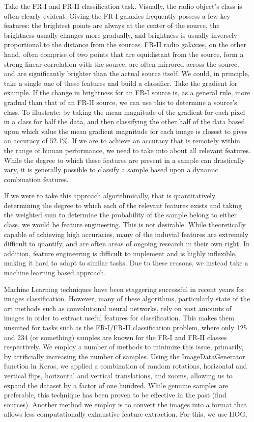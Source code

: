 \documentclass{article}
\begin{document}
Take the FR-I and FR-II classification task. Visually, the radio object's class is often clearly evident. Giving the FR-I galaxies frequently possess a few key features: the brightest points are always at the center of the source, the brightness usually changes more gradually, and brightness is usually inversely proportional to the distance from the sources.  FR-II radio galaxies, on the other hand, often comprise of two points that are equidistant from the source, form a strong linear correlation with the source, are often mirrored across the source, and are significantly brighter than the actual source itself. We could, in principle, take a single one of these features and build a classifier. Take the gradient for example. If the change in brightness for an FR-I source is, as a general rule, more gradual than that of an FR-II source, we can use this to determine a source's class. To illustrate: by taking the mean magnitude of the gradient for each pixel in a class for half the data, and then classifying the other half of the data based upon which value the mean gradient magnitude for each image is closest to gives an accuracy of 52.1\%. If we are to achieve an accuracy that is remotely within the range of human performance, we need to take into about all relevant features. While the degree to which these features are present in a sample can drastically vary, it is generally possible to classify a sample based upon a dynamic combination features. 

If we were to take this approach algorithmically, that is quantitatively determining the degree to which each of the relevant features exists and taking the weighted sum to determine the probability of the sample belong to either class, we would be feature engineering. This is not desirable. While theoretically capable of achieving high accuracies, many of the induvial features are extremely difficult to quantify, and are often areas of ongoing research in their own right. In addition, feature engineering is difficult to implement and is highly inflexible, making it hard to adapt to similar tasks. Due to these reasons, we instead take a machine learning based approach. 

Machine Learning techniques have been staggering successful in recent years for images classification. However, many of these algorithms, particularly state of the art methods such as convolutional neural networks, rely on vast amounts of images in order to extract useful features for classification. This makes them unsuited for tasks such as the FR-I/FR-II classification problem, where only 125 and 234 (or something) samples are known for the FR-I and FR-II classes respectively. We employ a number of methods to minimize this issue, primarily, by artificially increasing the number of samples. Using the ImageDataGenerator function in Keras, we applied a combination of random rotations, horizontal and vertical flips, horizontal and vertical translations, and zooms, allowing us to expand the dataset by a factor of one hundred. While genuine samples are preferable, this technique has been proven to be effective in the past (find sources).  Another method we employ is to convert the images into a format that allows less computationally exhaustive feature extraction. For this, we use HOG. 
\end{document}
